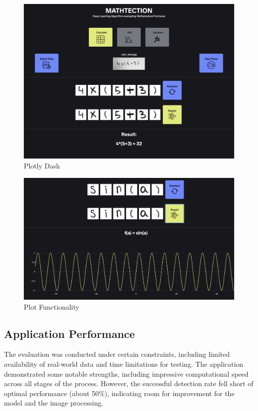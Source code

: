 \documentclass[@CLASSOPTIONS@]{tumarticle}
\begin{document}
\begin{figure}
    \begin{minipage}{0.48\textwidth}
     \centering
     \includegraphics[width=.9\linewidth]{figures/dash}
     \caption{Plotly Dash}\label{Fig:Dash}
   \end{minipage}
\end{figure}
\begin{figure}
    \begin{minipage}{0.48\textwidth}
     \centering
     \includegraphics[width=.9\linewidth]{figures/dash3}
     \caption{Plot Functionality}\label{Fig:Dash2}
   \end{minipage}
\end{figure}

\subsection{Application Performance}

The evaluation was conducted under certain constraints,
including limited availability of real-world data and time limitations for testing.
The application demonstrated some notable strengths, including impressive computational
speed across all stages of the process.
However, the successful detection rate fell short of optimal performance (about 50\%), indicating room
for improvement for the model and the image processing.
\end{document}
